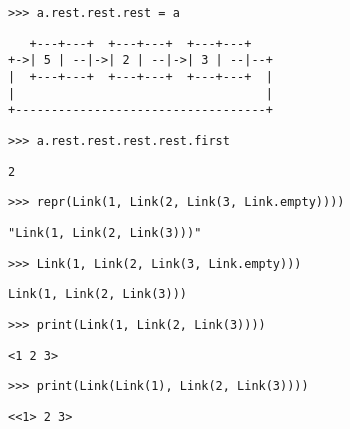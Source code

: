 \begin{blocksection}
\begin{lstlisting}
>>> a.rest.rest.rest = a
\end{lstlisting}
\begin{solution}[0in]
\begin{lstlisting}
   +---+---+  +---+---+  +---+---+
+->| 5 | --|->| 2 | --|->| 3 | --|--+
|  +---+---+  +---+---+  +---+---+  |
|                                   |
+-----------------------------------+
\end{lstlisting}
\end{solution}

\begin{lstlisting}
>>> a.rest.rest.rest.rest.first
\end{lstlisting}
\begin{solution}[.25in]
\begin{lstlisting}
2
\end{lstlisting}
\end{solution}

\begin{lstlisting}
>>> repr(Link(1, Link(2, Link(3, Link.empty))))
\end{lstlisting}
\begin{solution}[.25in]
\begin{lstlisting}
"Link(1, Link(2, Link(3)))"
\end{lstlisting}
\end{solution}

\begin{lstlisting}
>>> Link(1, Link(2, Link(3, Link.empty)))
\end{lstlisting}
\begin{solution}[.25in]
\begin{lstlisting}
Link(1, Link(2, Link(3)))
\end{lstlisting}
\end{solution}

\begin{lstlisting}
>>> print(Link(1, Link(2, Link(3))))
\end{lstlisting}
\begin{solution}[.25in]
\begin{lstlisting}
<1 2 3>
\end{lstlisting}
\end{solution}

\begin{lstlisting}
>>> print(Link(Link(1), Link(2, Link(3))))
\end{lstlisting}
\begin{solution}[.25in]
\begin{lstlisting}
<<1> 2 3>
\end{lstlisting}
\end{solution}

\end{blocksection}
